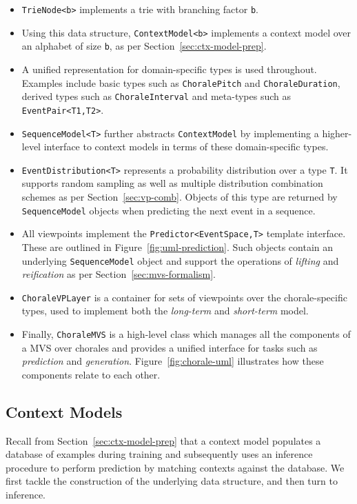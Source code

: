 \documentclass[12pt,a4paper,twoside,openright]{report}
\newcommand{\sref}[1]{Section~\ref{#1}}
\begin{document}
\begin{itemize}
  \item \texttt{TrieNode<b>} implements a trie with branching factor \texttt{b}.
  \item Using this data structure, \texttt{ContextModel<b>} implements a context
    model over an alphabet of size \texttt{b}, as per
    \sref{sec:ctx-model-prep}.   
  \item A unified representation for domain-specific types is used throughout.
    Examples include basic types such as \texttt{ChoralePitch} and
    \texttt{ChoraleDuration}, derived types such as \texttt{ChoraleInterval} and
    meta-types such as \texttt{EventPair<T1,T2>}.
  \item \texttt{SequenceModel<T>} further abstracts \texttt{ContextModel} by
    implementing a higher-level interface to context models in terms of these
    domain-specific types.
  \item \texttt{EventDistribution<T>} represents a probability distribution over
    a type \texttt{T}. It supports random sampling as well as multiple
    distribution combination schemes as per \sref{sec:vp-comb}. Objects
    of this type are returned by \texttt{SequenceModel} objects when predicting
    the next event in a sequence.
  \item All viewpoints implement the \texttt{Predictor<EventSpace,T>} template
    interface. These are outlined in Figure~\ref{fig:uml-prediction}. Such
    objects contain an underlying \texttt{SequenceModel} object and support the
    operations of \emph{lifting} and \emph{reification} as per
    \sref{sec:mvs-formalism}.
  \item \texttt{ChoraleVPLayer} is a container for sets of viewpoints over the
    chorale-specific types, used to implement both the \emph{long-term} and
    \emph{short-term} model.
  \item Finally, \texttt{ChoraleMVS} is a high-level class which manages all the
    components of a MVS over chorales and provides a unified interface for tasks
    such as \emph{prediction} and \emph{generation}.
    Figure~\ref{fig:chorale-uml} illustrates how these components relate to each
    other.
\end{itemize}

\subsection{Context Models}

Recall from \sref{sec:ctx-model-prep} that a context model populates a
database of examples during training and subsequently uses an inference
procedure to perform prediction by matching contexts against the database. We
first tackle the construction of the underlying data structure, and then turn to
inference.
\end{document}
